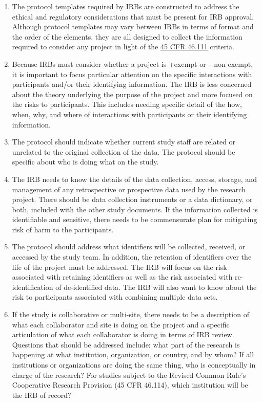 \documentclass[
]{book}
\begin{document}
\begin{enumerate}
\def\labelenumi{\arabic{enumi}.}
\item
  The protocol templates required by IRBs are constructed to address the ethical and regulatory considerations that must be present for IRB approval. Although protocol templates may vary between IRBs in terms of format and the order of the elements, they are all designed to collect the information required to consider any project in light of the \href{https://www.law.cornell.edu/cfr/text/45/46.111}{45 CFR 46.111} criteria.
\item
  Because IRBs must consider whether a project is +exempt\textbar{} or +non-exempt\textbar, it is important to focus particular attention on the specific interactions with participants and/or their identifying information. The IRB is less concerned about the theory underlying the purpose of the project and more focused on the risks to participants. This includes needing specific detail of the how, when, why, and where of interactions with participants or their identifying information.
\item
  The protocol should indicate whether current study staff are related or unrelated to the original collection of the data. The protocol should be specific about who is doing what on the study.
\item
  The IRB needs to know the details of the data collection, access, storage, and management of any retrospective or prospective data used by the research project. There should be data collection instruments or a data dictionary, or both, included with the other study documents. If the information collected is identifiable and sensitive, there needs to be commensurate plan for mitigating risk of harm to the participants.
\item
  The protocol should address what identifiers will be collected, received, or accessed by the study team. In addition, the retention of identifiers over the life of the project must be addressed. The IRB will focus on the risk associated with retaining identifiers as well as the risk associated with re-identification of de-identified data. The IRB will also want to know about the risk to participants associated with combining multiple data sets.
\item
  If the study is collaborative or multi-site, there needs to be a description of what each collaborator and site is doing on the project and a specific articulation of what each collaborator is doing in terms of IRB review. Questions that should be addressed include: what part of the research is happening at what institution, organization, or country, and by whom? If all institutions or organizations are doing the same thing, who is conceptually in charge of the research? For studies subject to the Revised Common Rule's Cooperative Research Provision (45 CFR 46.114), which institution will be the IRB of record?

\end{enumerate}
\end{document}
